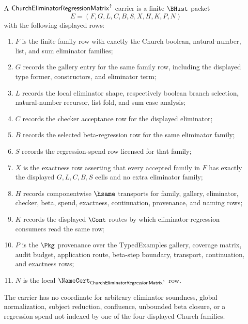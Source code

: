\begin{definition}
\label{def:church-eliminator-regression-matrix-carrier}
A $\mathsf{ChurchEliminatorRegressionMatrix}^{\uparrow}$ carrier is a finite $\BHist$ packet
$$
E=(F,G,L,C,B,S,X,H,K,P,N)
$$
with the following displayed rows:
\begin{enumerate}
\item $F$ is the finite family row with exactly the Church boolean, natural-number, list, and sum eliminator families;
\item $G$ records the gallery entry for the same family row, including the displayed type former, constructors, and eliminator term;
\item $L$ records the local eliminator shape, respectively boolean branch selection, natural-number recursor, list fold, and sum case analysis;
\item $C$ records the checker acceptance row for the displayed eliminator;
\item $B$ records the selected beta-regression row for the same eliminator family;
\item $S$ records the regression-spend row licensed for that family;
\item $X$ is the exactness row asserting that every accepted family in $F$ has exactly the displayed $G,L,C,B,S$ cells and no extra eliminator family;
\item $H$ records componentwise $\hsame$ transports for family, gallery, eliminator, checker, beta, spend, exactness, continuation, provenance, and naming rows;
\item $K$ records the displayed $\Cont$ routes by which eliminator-regression consumers read the same row;
\item $P$ is the $\Pkg$ provenance over the TypedExamples gallery, coverage matrix, audit budget, application route, beta-step boundary, transport, continuation, and exactness rows;
\item $N$ is the local $\NameCert_{\ChurchEliminatorRegressionMatrixUp}$ row.
\end{enumerate}
The carrier has no coordinate for arbitrary eliminator soundness, global normalization, subject reduction, confluence, unbounded beta closure, or a regression spend not indexed by one of the four displayed Church families.
\end{definition}

